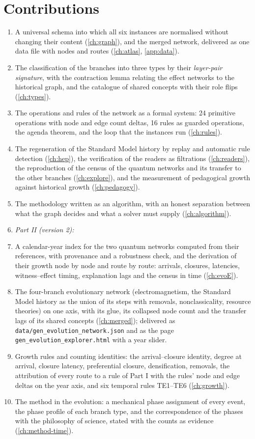 \documentclass[11pt,a4paper,twoside,openany]{report}
\theoremstyle{plain}
\theoremstyle{definition}
\theoremstyle{remark}
\begin{document}
\section{Contributions}
\begin{enumerate}[nosep]
\item A universal schema into which all six instances are normalised without changing their content (\cref{ch:graph}), and the merged network, delivered as one data file with \NnNodes{} nodes and \NnRoutes{} routes (\cref{ch:atlas}, \cref{app:data}).
\item The classification of the branches into three types by their \emph{layer-pair signature}, with the contraction lemma relating the effect networks to the historical graph, and the catalogue of \NnConcepts{} shared concepts with their \NnFlips{} role flips (\cref{ch:types}).
\item The operations and rules of the network as a formal system: 24 primitive operations with node and edge count deltas, 16 rules as guarded operations, the agenda theorem, and the loop that the instances run (\cref{ch:rules}).
\item The regeneration of the Standard Model history by replay and automatic rule detection (\cref{ch:hep}), the verification of the readers as filtrations (\cref{ch:readers}), the reproduction of the census of the quantum networks and its transfer to the other branches (\cref{ch:explore}), and the measurement of pedagogical growth against historical growth (\cref{ch:pedagogy}).
\item The methodology written as an algorithm, with an honest separation between what the graph decides and what a solver must supply (\cref{ch:algorithm}).
\item[] \emph{Part II (version 2):}
\item A calendar-year index for the two quantum networks computed from their references, with provenance and a robustness check, and the derivation of their growth node by node and route by route: arrivals, closures, latencies, witness--effect timing, explanation lags and the census in time (\cref{ch:evoE}).
\item The four-branch evolutionary network (electromagnetism, the Standard Model history as the union of its steps with removals, nonclassicality, resource theories) on one axis, with its glue, its collapsed node count and the transfer lags of its shared concepts (\cref{ch:merged}); delivered as \texttt{data/gen\_evolution\_network.json} and as the page \texttt{gen\_evolution\_explorer.html} with a year slider.
\item Growth rules and counting identities: the arrival--closure identity, degree at arrival, closure latency, preferential closure, densification, removals, the attribution of every route to a rule of Part I with the rules' node and edge deltas on the year axis, and six temporal rules TE1--TE6 (\cref{ch:growth}).
\item The method in the evolution: a mechanical phase assignment of every event, the phase profile of each branch type, and the correspondence of the phases with the philosophy of science, stated with the counts as evidence (\cref{ch:method-time}).
\end{enumerate}
\end{document}

